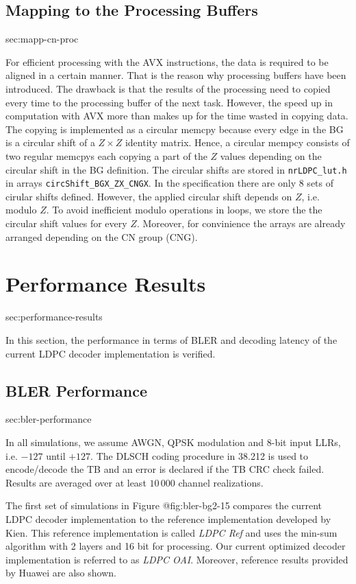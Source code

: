 \documentclass{article}
\begin{document}
\subsection{Mapping to the Processing Buffers}{sec:mapp-cn-proc}

For efficient processing with the AVX instructions, the data is required to be aligned in a certain manner. That is the reason why processing buffers have been introduced. The drawback is that the results of the processing need to copied every time to the processing buffer of the next task. However, the speed up in computation with AVX more than makes up for the time wasted in copying data. The copying is implemented as a circular memcpy because every edge in the BG is a circular shift of a $Z\times Z$ identity matrix. Hence, a circular mempcy consists of two regular memcpys each copying a part of the $Z$ values depending on the circular shift in the BG definition. The circular shifts are stored in \texttt{nrLDPC\_lut.h} in arrays \texttt{circShift\_BGX\_ZX\_CNGX}. In the specification there are only 8 sets of cirular shifts defined. However, the applied circular shift depends on $Z$, i.e. modulo $Z$. To avoid inefficient modulo operations in loops, we store the the circular shift values for every $Z$. Moreover, for convinience the arrays are already arranged depending on the CN group (CNG).

\newpage
\section{Performance Results}{sec:performance-results}

In this section, the performance in terms of BLER and decoding latency of the current LDPC decoder implementation is verified.

\subsection{BLER Performance}{sec:bler-performance}

In all simulations, we assume AWGN, QPSK modulation and 8-bit input LLRs, i.e. $-127$ until $+127$. The DLSCH coding procedure in 38.212 is used to encode/decode the TB and an error is declared if the TB CRC check failed. Results are averaged over at least $10\,000$ channel realizations. 

The first set of simulations in Figure {@fig:bler-bg2-15} compares the current LDPC decoder implementation to the reference implementation developed by Kien. This reference implementation is called \textit{LDPC Ref} and uses the min-sum algorithm with 2 layers and 16 bit for processing. Our current optimized decoder implementation is referred to as \textit{LDPC OAI}. Moreover, reference results provided by Huawei are also shown.
\end{document}
